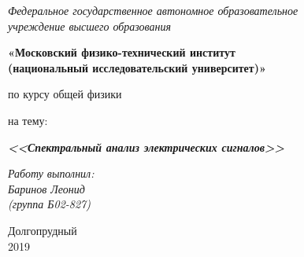 \thispagestyle{empty}
\begin{center}
    \textit{Федеральное государственное автономное образовательное\\ учреждение высшего образования }

    \vspace{0.5ex}

        \textbf{«Московский физико-технический институт\\ (национальный исследовательский университет)»}
\end{center}

\vspace{10ex}

\begin{center}
    \vspace{13ex}


    \vspace{1ex}

    по курсу общей физики

    на тему:

    \textbf{\textit{<<Спектральный
    анализ электрических сигналов>>}}

    \vspace{30ex}

    \begin{flushright}
        \noindent
        \textit{Работу выполнил:}\\  
        \textit{Баринов Леонид \\(группа Б02-827)}
    \end{flushright}
    \vfill
    Долгопрудный \\2019
\newpage
\setcounter{page}{1}
\fancyhead[R]{\nouppercase{\leftmark}}	
\end{center}
